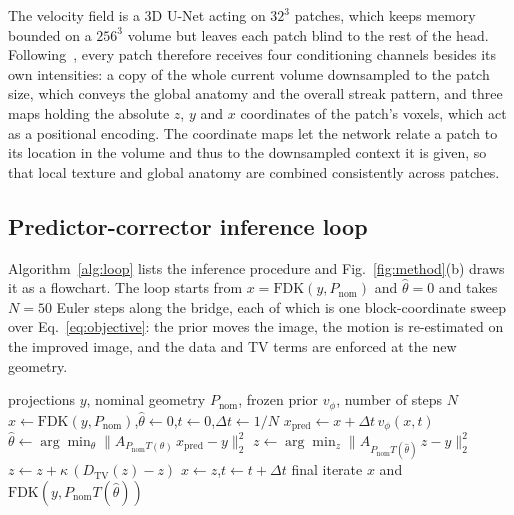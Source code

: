 \documentclass[11pt]{article}
\newcommand{\FDK}{\mathrm{FDK}}
\newcommand{\thetahat}{\hat\theta}
\newcommand{\Pnom}{P_{\mathrm{nom}}}
\begin{document}
The velocity field is a 3D U-Net acting on $32^3$ patches, which keeps memory bounded on a
$256^3$ volume but leaves each patch blind to the rest of the head. Following~\cite{yang25},
every patch therefore receives four conditioning channels besides its own intensities: a
copy of the whole current volume downsampled to the patch size, which conveys the global
anatomy and the overall streak pattern, and three maps holding the absolute $z$, $y$ and
$x$ coordinates of the patch's voxels, which act as a positional encoding. The coordinate
maps let the network relate a patch to its location in the volume and thus to the
downsampled context it is given, so that local texture and global anatomy are combined
consistently across patches.

\subsection{Predictor-corrector inference loop}
\label{sec:loop}

Algorithm~\ref{alg:loop} lists the inference procedure and Fig.~\ref{fig:method}(b)
draws it as a flowchart. The loop starts from
$x = \FDK(y,\Pnom)$ and $\thetahat = 0$ and takes $N{=}50$ Euler steps along the bridge,
each of which is one block-coordinate sweep over Eq.~\eqref{eq:objective}: the prior
moves the image, the motion is re-estimated on the improved image, and the data and TV
terms are enforced at the new geometry.

\begin{algorithm}[H]
\caption{Blind rigid-motion correction along the geometry bridge}
\label{alg:loop}
\begin{algorithmic}[1]
\Require projections $y$, nominal geometry $\Pnom$, frozen prior $v_\phi$, number of steps $N$
\State $x \gets \FDK(y,\Pnom)$,\quad $\thetahat \gets 0$,\quad $t \gets 0$,\quad $\Delta t \gets 1/N$
  \State $x_{\mathrm{pred}} \gets x + \Delta t\, v_\phi(x,t)$ 
  \State $\thetahat \gets \arg\min_\theta \|A_{\Pnom T(\theta)}\,x_{\mathrm{pred}} - y\|_2^2$ 
  \State $z \gets \arg\min_z \|A_{\Pnom T(\thetahat)}\,z - y\|_2^2$ 
  \State $z \gets z + \kappa\,(D_{\mathrm{TV}}(z) - z)$ 
  \State $x \gets z$,\quad $t \gets t + \Delta t$
\EndFor
\State \Return final iterate $x$ and $\FDK(y,\Pnom T(\thetahat))$
\end{algorithmic}
\end{algorithm}
\end{document}
